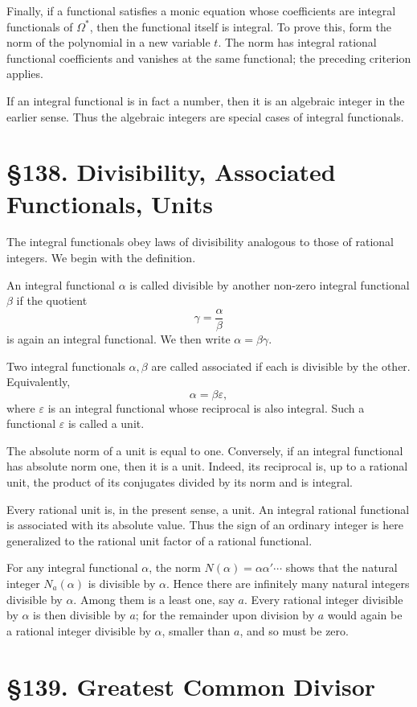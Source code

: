 \documentclass[12pt,a4paper]{article}
\newcommand{\webersection}[2]{\clearpage\section*{\S #1. #2}}
\begin{document}
Finally, if a functional satisfies a monic equation whose coefficients are integral functionals of \(\Omega^*\), then the functional itself is integral.  To prove this, form the norm of the polynomial in a new variable \(t\).  The norm has integral rational functional coefficients and vanishes at the same functional; the preceding criterion applies.

If an integral functional is in fact a number, then it is an algebraic integer in the earlier sense.  Thus the algebraic integers are special cases of integral functionals.

\webersection{138}{Divisibility, Associated Functionals, Units}

The integral functionals obey laws of divisibility analogous to those of rational integers.  We begin with the definition.

An integral functional \(\alpha\) is called divisible by another non-zero integral functional \(\beta\) if the quotient
\[
 \gamma=\frac{\alpha}{\beta}
\]
is again an integral functional.  We then write \(\alpha=\beta\gamma\).

Two integral functionals \(\alpha,\beta\) are called associated if each is divisible by the other.  Equivalently,
\[
 \alpha=\beta\varepsilon,
\]
where \(\varepsilon\) is an integral functional whose reciprocal is also integral.  Such a functional \(\varepsilon\) is called a unit.

The absolute norm of a unit is equal to one.  Conversely, if an integral functional has absolute norm one, then it is a unit.  Indeed, its reciprocal is, up to a rational unit, the product of its conjugates divided by its norm and is integral.

Every rational unit is, in the present sense, a unit.  An integral rational functional is associated with its absolute value.  Thus the sign of an ordinary integer is here generalized to the rational unit factor of a rational functional.

For any integral functional \(\alpha\), the norm \(N(\alpha)=\alpha\alpha'\cdots\) shows that the natural integer \(N_a(\alpha)\) is divisible by \(\alpha\).  Hence there are infinitely many natural integers divisible by \(\alpha\).  Among them is a least one, say \(a\).  Every rational integer divisible by \(\alpha\) is then divisible by \(a\); for the remainder upon division by \(a\) would again be a rational integer divisible by \(\alpha\), smaller than \(a\), and so must be zero.

\webersection{139}{Greatest Common Divisor}
\end{document}
